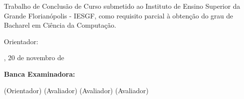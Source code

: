 \begin{folhadeaprovacao}
    \centering
    \imprimirautor
    
    \vspace*{2.5cm}
    
    \begin{citacao}
        Trabalho de Conclusão de Curso submetido ao Instituto de Ensino
        Superior da
        Grande Florianópolis - IESGF, como requisito parcial à obtenção do grau
        de Bacharel em Ciência da Computação.
        
        Orientador: \imprimirorientador
    \end{citacao}
    
    \vspace*{1cm}
    
    \large{\imprimirlocal, 20 de novembro de \imprimirdata}
    
    \vspace*{1cm}
    
    \textbf{Banca Examinadora:}
    
    \vspace*{0.5cm}
    
    \assinatura{\imprimirorientador}
    (Orientador)
    (Avaliador)
    (Avaliador)
    (Avaliador)
    
    \vspace*{1cm}

\end{folhadeaprovacao}



















